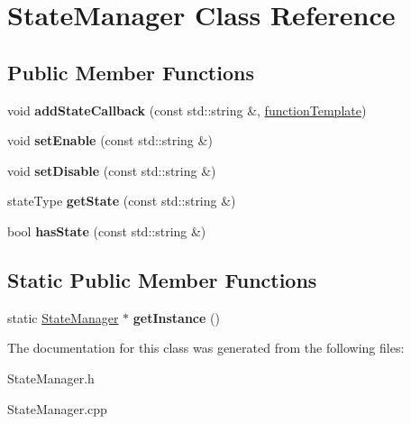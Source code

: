 \hypertarget{class_state_manager}{\section{State\-Manager Class Reference}
\label{d4/d44/class_state_manager}
}
\subsection*{Public Member Functions}
\begin{DoxyCompactItemize}
\item 
\hypertarget{class_state_manager_ad9846b178b84ef63dbb10a14b7f3b41c}{void {\bfseries add\-State\-Callback} (const std\-::string \&, \hyperlink{_callback_manager_8h_a73a0c6254a0b5ab661ca1f3bd5f3d99c}{function\-Template})}\label{d4/d44/class_state_manager_ad9846b178b84ef63dbb10a14b7f3b41c}

\item 
\hypertarget{class_state_manager_aaa3190e62148f465421a3736aa4da74f}{void {\bfseries set\-Enable} (const std\-::string \&)}\label{d4/d44/class_state_manager_aaa3190e62148f465421a3736aa4da74f}

\item 
\hypertarget{class_state_manager_a0cb5d48956152fdcb9b68bb9213db1a3}{void {\bfseries set\-Disable} (const std\-::string \&)}\label{d4/d44/class_state_manager_a0cb5d48956152fdcb9b68bb9213db1a3}

\item 
\hypertarget{class_state_manager_a44f0d4f64570bfbbc177e6045a5e166f}{state\-Type {\bfseries get\-State} (const std\-::string \&)}\label{d4/d44/class_state_manager_a44f0d4f64570bfbbc177e6045a5e166f}

\item 
\hypertarget{class_state_manager_a0bd2dc523c130194261e20352dca2425}{bool {\bfseries has\-State} (const std\-::string \&)}\label{d4/d44/class_state_manager_a0bd2dc523c130194261e20352dca2425}

\end{DoxyCompactItemize}
\subsection*{Static Public Member Functions}
\begin{DoxyCompactItemize}
\item 
\hypertarget{class_state_manager_af46b68eb47c2eca13221aacf09997f89}{static \hyperlink{class_state_manager}{State\-Manager} $\ast$ {\bfseries get\-Instance} ()}\label{d4/d44/class_state_manager_af46b68eb47c2eca13221aacf09997f89}

\end{DoxyCompactItemize}


The documentation for this class was generated from the following files\-:\begin{DoxyCompactItemize}
\item 
State\-Manager.\-h\item 
State\-Manager.\-cpp\end{DoxyCompactItemize}
